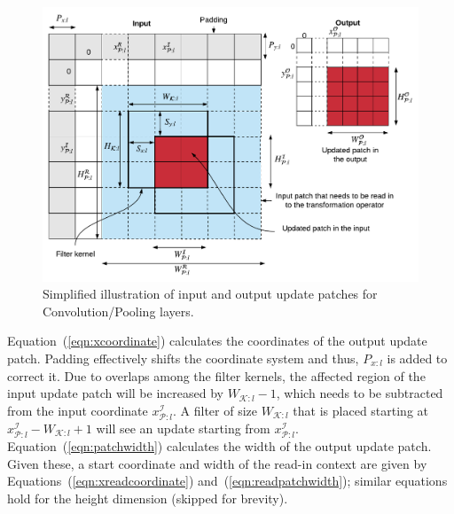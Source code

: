 \begin{figure}[t]
\includegraphics[width=\columnwidth]{images/dimensions}
\vspace{-8mm}
\caption{Simplified illustration of input and output update patches for Convolution/Pooling layers.}
\label{fig:dimensions}
\end{figure}


Equation~(\ref{eqn:xcoordinate}) calculates the coordinates of the output update patch. Padding effectively shifts the coordinate system and thus, $P_{x:l}$ is added to correct it. Due to overlaps among the filter kernels, the affected region of the input update patch will be increased by $W_{\mathcal{K}:l}-1$, which needs to be subtracted from the input coordinate $x^\mathcal{I}_{\mathcal{P}:l}$. A filter of size $W_{\mathcal{K}:l}$ that is placed starting at $x^\mathcal{I}_{\mathcal{P}:l} - W_{\mathcal{K}:l} + 1$ will see an update starting from $x^\mathcal{I}_{\mathcal{P}:l}$. Equation~(\ref{eqn:patchwidth}) calculates the width of the output update patch. Given these, a start coordinate and width of the read-in context are given by Equations~(\ref{eqn:xreadcoordinate}) and~(\ref{eqn:readpatchwidth}); similar equations hold for the height dimension (skipped for brevity).


